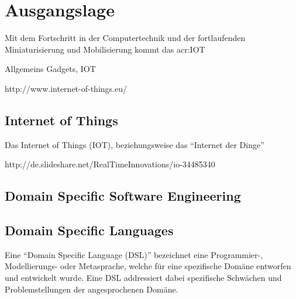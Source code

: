 \chapter{Ausgangslage}

Mit dem Fortschritt in der Computertechnik und der fortlaufenden Miniaturisierung und Mobilisierung kommt das \gls{acr:IOT}

Allgemeins Gadgets, IOT

http://www.internet-of-things.eu/

\section{Internet of Things}
Das Internet of Things (IOT), beziehungsweise das "`Internet der Dinge"' 

http://de.slideshare.net/RealTimeInnovations/io-34485340

\section{Domain Specific Software Engineering}


\section{Domain Specific Languages}
Eine "`Domain Specific Language (DSL)"' bezeichnet eine Programmier-, Modellierungs- oder Metasprache, welche für eine spezifische Domäne entworfen und entwickelt wurde. Eine DSL addressiert dabei spezifische Schwächen und Problemstellungen der angesprochenen Domäne.



